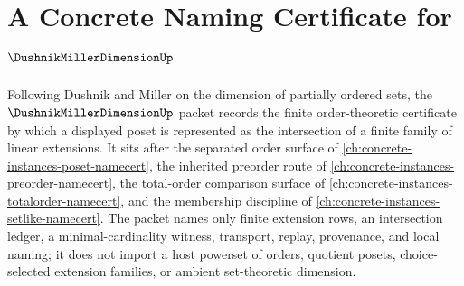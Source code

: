 \chapter{A Concrete Naming Certificate for $\DushnikMillerDimensionUp$}
\label{ch:concrete-instances-dushnik-miller-dimension-namecert}

Following Dushnik and Miller on the dimension of partially ordered sets, the $\DushnikMillerDimensionUp$ packet records the finite order-theoretic certificate by which a displayed poset is represented as the intersection of a finite family of linear extensions. It sits after the separated order surface of \autoref{ch:concrete-instances-poset-namecert}, the inherited preorder route of \autoref{ch:concrete-instances-preorder-namecert}, the total-order comparison surface of \autoref{ch:concrete-instances-totalorder-namecert}, and the membership discipline of \autoref{ch:concrete-instances-setlike-namecert}. The packet names only finite extension rows, an intersection ledger, a minimal-cardinality witness, transport, replay, provenance, and local naming; it does not import a host powerset of orders, quotient posets, choice-selected extension families, or ambient set-theoretic dimension.

